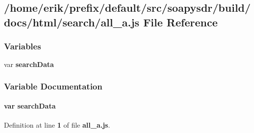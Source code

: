 \subsection{/home/erik/prefix/default/src/soapysdr/build/docs/html/search/all\+\_\+a.js File Reference}
\label{all__a_8js}
\subsubsection*{Variables}
\begin{DoxyCompactItemize}
\item 
var {\bf search\+Data}
\end{DoxyCompactItemize}


\subsubsection{Variable Documentation}
\paragraph[{search\+Data}]{\setlength{\rightskip}{0pt plus 5cm}var search\+Data}\label{all__a_8js_ad01a7523f103d6242ef9b0451861231e}


Definition at line {\bf 1} of file {\bf all\+\_\+a.\+js}.

